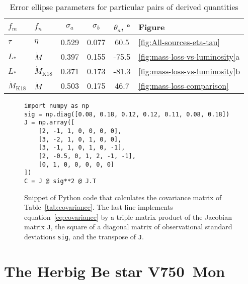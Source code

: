 \documentclass[useAMS, usenatbib, a4paper]{mnras}
\begin{document}
\begin{table}
  \centering
  \caption[Error ellipse]{Error ellipse parameters for particular pairs of derived quantities}
  \label{tab:error-ellipse}
  \begin{tabular}{l l S S S l}
    \toprule
    \(f_m\) & \(f_n\) &  {\(\sigma_a\)} & {\(\sigma_b\)}
    & {\(\theta_a\), \si{\degree}} & Figure   \\
    \midrule
    \(\tau\) & \(\eta\) & 0.529 & 0.077 & 60.5 & \ref{fig:All-sources-eta-tau} \\
    \(L_*\) & \(\dot M\) & 0.397 & 0.155 & -75.5 & \ref{fig:mass-loss-vs-luminosity}a \\
    \(L_*\) & \(\dot M_{\text{K18}}\) & 0.371 & 0.173 & -81.3 & \ref{fig:mass-loss-vs-luminosity}b \\
    \(\dot M_{\text{K18}}\) & \(\dot M\) & 0.503 & 0.175 & 46.7 & \ref{fig:mass-loss-comparison} \\
    \bottomrule
  \end{tabular}
\end{table}


\begin{figure}
  \centering
  \footnotesize
  \begin{verbatim}
import numpy as np
sig = np.diag([0.08, 0.18, 0.12, 0.12, 0.11, 0.08, 0.18])
J = np.array([
    [2, -1, 1, 0, 0, 0, 0],
    [3, -2, 1, 0, 1, 0, 0],
    [3, -1, 1, 0, 1, 0, -1],
    [2, -0.5, 0, 1, 2, -1, -1],
    [0, 1, 0, 0, 0, 0, 0]
])
C = J @ sig**2 @ J.T
  \end{verbatim}
  \vspace*{-\baselineskip}
  \caption{Snippet of Python code that calculates the
    covariance matrix of Table~\ref{tab:covariance}.  The last line
    implements equation~\eqref{eq:covariance} by a triple matrix
    product of the Jacobian matrix \texttt{J}, the square of a
    diagonal matrix of observational standard deviations \texttt{sig},
    and the transpose of \texttt{J}.}
  \label{fig:python-covar}
\end{figure}



 

\section{The Herbig Be star V750~Mon}
\label{sec:notes-part-sourc}
\label{sec:hd-53367-v750}
  
\end{document}
